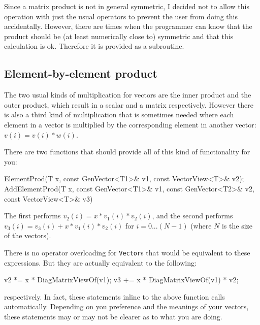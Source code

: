 \documentclass[twoside,letterpaper,11pt]{article}
\renewcommand{\tt}[1]{{\lstinline {#1}}}
\begin{document}
Since a matrix product is not in general symmetric, I decided not to allow 
this operation with just the usual operators to prevent the user from doing 
this accidentally.  However, there are times when the 
programmer can know that the product should be (at least numerically close to)
symmetric and that this calculation is ok.  Therefore it is provided as a subroutine.

\subsection{Element-by-element product}
\label{ElementProd}

The two usual kinds of multiplication for vectors are the inner product and 
the outer product, which result in a scalar and a matrix respectively.
However there is also a third kind of multiplication that is sometimes needed where
each element in a vector is multiplied by the
corresponding element in another vector: $v(i) = v(i) * w(i)$.

There are two functions that should provide all of this kind of functionality
for you:
\begin{tmvcode}
ElementProd(T x, const GenVector<T1>& v1, const VectorView<T>& v2);
AddElementProd(T x, const GenVector<T1>& v1, const GenVector<T2>& v2,
      const VectorView<T>& v3)
\end{tmvcode}
The first performs $v_2(i) = x * v_1(i) * v_2(i)$, and the second performs
$v_3(i) = v_3(i) + x * v_1(i) * v_2(i)$ for $i = 0 ... (N-1)$ (where $N$ is the 
size of the vectors).

There is no operator overloading for \tt{Vector}s that would be equivalent to 
these expressions.
But they are actually equivalent to the following:
\begin{tmvcode}
v2 *= x * DiagMatrixViewOf(v1);
v3 += x * DiagMatrixViewOf(v1) * v2;
\end{tmvcode}
respectively.  In fact, these statements inline to the above function calls
automatically.  Depending on you preference and the meanings of your vectors,
these statements may or may not be clearer as to what you are doing.
\end{document}
